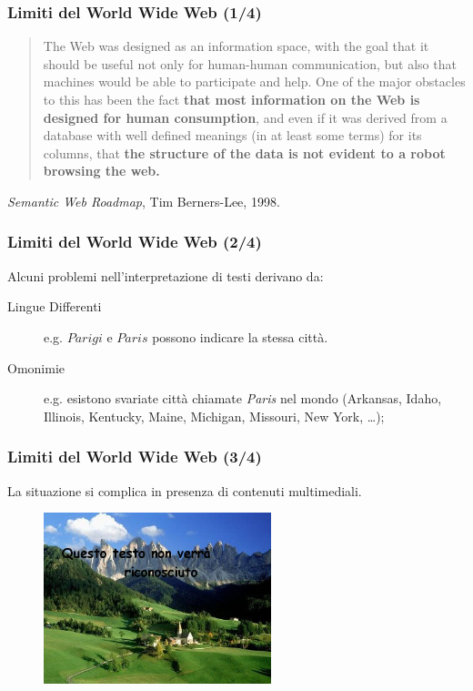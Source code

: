 \documentclass[8pt]{beamer}
\begin{document}
\begin{frame}
\frametitle{Limiti del World Wide Web (1/4)}
\begin{quote}
The Web was designed as an information space, with the goal that it should be 
useful not only for human-human communication, but also that machines would be
able to participate and help. One of the major obstacles to this has been the
fact \textbf{that most information on the Web is designed for human consumption}, and 
even if it was derived from a database with well defined meanings (in at least 
some terms) for its columns, that \textbf{the structure of the data is not evident to 
a robot browsing the web.}  
\end{quote}
\vspace{\baselineskip}
\emph{Semantic Web Roadmap}, Tim Berners-Lee, 1998.
\end{frame}

\begin{frame}
\frametitle{Limiti del World Wide Web (2/4)}
Alcuni problemi nell'interpretazione di testi derivano da:
\begin{description}
 \item[Lingue Differenti] e.g. $Parigi$ e $Paris$ possono indicare la stessa citt\`a.
 \item[Omonimie] e.g. esistono svariate citt\`a chiamate 
 \emph{Paris} nel mondo (Arkansas, Idaho, Illinois, Kentucky,
 Maine, Michigan, Missouri, New York, \ldots);
\end{description}
\end{frame}

\begin{frame}
\frametitle{Limiti del World Wide Web (3/4)}

La situazione si complica in presenza di contenuti multimediali.

\begin{figure}
    \includegraphics[width=250px]{unrecognizable.jpg} 
\end{figure}
\end{frame}
\end{document}
